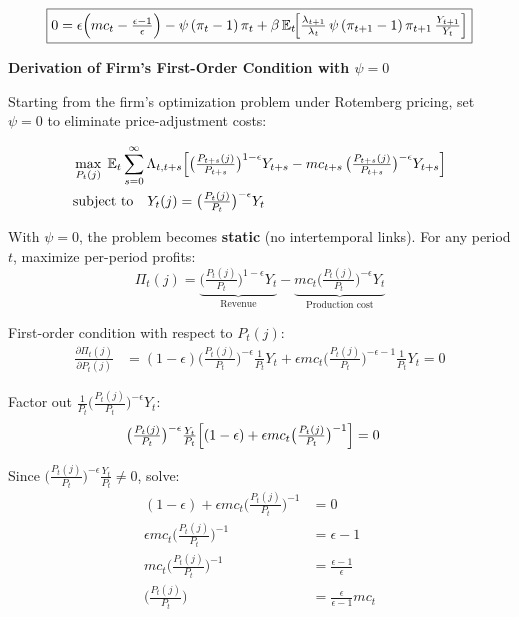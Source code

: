 \documentclass[11pt,preprint]{elsarticle}
\numberwithin{equation}{section}
\numberwithin{figure}{section}
\numberwithin{table}{section}
\begin{document}
\begin{equation}\label{rotemberg_FOC}
\boxed{
  0 = \epsilon\Bigl(mc_t - \tfrac{\epsilon-1}{\epsilon}\Bigr)
      - \psi\,(\pi_t - 1)\,\pi_t
      + \beta\,\mathbb{E}_t\!
        \Bigl[
          \tfrac{\lambda_{t+1}}{\lambda_t}\,
          \psi\,(\pi_{t+1}-1)\,\pi_{t+1}\,
          \tfrac{Y_{t+1}}{Y_t}
        \Bigr]
}
\end{equation}

\newpage

\textbf{Derivation of Firm's First-Order Condition with \(\psi = 0\)}

Starting from the firm's optimization problem under Rotemberg pricing,
set \(\psi = 0\) to eliminate price-adjustment costs:

\begin{align*}
& \max_{P_t(j)} \;\mathbb{E}_t \sum_{s=0}^{\infty} \Lambda_{t,t+s}
  \Bigl[
    \bigl(\tfrac{P_{t+s}(j)}{P_{t+s}}\bigr)^{1-\epsilon} Y_{t+s}
    - mc_{t+s}\,\bigl(\tfrac{P_{t+s}(j)}{P_{t+s}}\bigr)^{-\epsilon} Y_{t+s}
  \Bigr] \\
& \text{subject to} \quad Y_t(j) = \bigl(\tfrac{P_t(j)}{P_t}\bigr)^{-\epsilon} Y_t
\end{align*}

With \(\psi = 0\), the problem becomes \textbf{static} (no intertemporal
links). For any period \(t\), maximize per-period profits:\\
\[
\Pi_t(j) = \underbrace{\bigl(\tfrac{P_t(j)}{P_t}\bigr)^{1-\epsilon} Y_t}_{\text{Revenue}} - \underbrace{mc_t \bigl(\tfrac{P_t(j)}{P_t}\bigr)^{-\epsilon} Y_t}_{\text{Production cost}}
\]

First-order condition with respect to \(P_t(j)\):\\
\begin{align*}
\frac{\partial \Pi_t(j)}{\partial P_t(j)} 
&= (1-\epsilon) \bigl(\tfrac{P_t(j)}{P_t}\bigr)^{-\epsilon} \tfrac{1}{P_t} Y_t + \epsilon  mc_t \bigl(\tfrac{P_t(j)}{P_t}\bigr)^{-\epsilon-1} \tfrac{1}{P_t} Y_t = 0
\end{align*}

Factor out
\(\frac{1}{P_t} \bigl(\tfrac{P_t(j)}{P_t}\bigr)^{-\epsilon} Y_t\):\\
\begin{align*}
\bigl(\tfrac{P_t(j)}{P_t}\bigr)^{-\epsilon} \tfrac{Y_t}{P_t} \Bigl[(1-\epsilon) + \epsilon  mc_t \bigl(\tfrac{P_t(j)}{P_t}\bigr)^{-1} \Bigr] &= 0
\end{align*}

Since
\(\bigl(\tfrac{P_t(j)}{P_t}\bigr)^{-\epsilon} \frac{Y_t}{P_t} \neq 0\),
solve:\\
\begin{align*}
(1-\epsilon) + \epsilon  mc_t \bigl(\tfrac{P_t(j)}{P_t}\bigr)^{-1} &= 0 \\
\epsilon  mc_t \bigl(\tfrac{P_t(j)}{P_t}\bigr)^{-1} &= \epsilon - 1 \\
mc_t \bigl(\tfrac{P_t(j)}{P_t}\bigr)^{-1} &= \frac{\epsilon - 1}{\epsilon} \\
\bigl(\tfrac{P_t(j)}{P_t}\bigr) &= \frac{\epsilon}{\epsilon - 1} mc_t
\end{align*}
\end{document}
